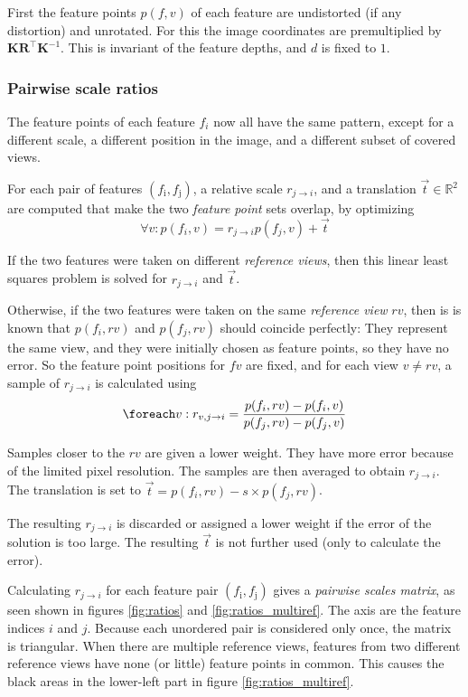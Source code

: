 \documentclass[11pt]{scrreprt}
\newcommand{\matr}[1]{\mathbf{#1}}
\newcommand{\transpose}[1]{#1^\intercal}
\begin{document}
First the feature points $p(f,v)$ of each feature are undistorted (if any distortion) and unrotated. For this the image coordinates are premultiplied by $\matr{K} \transpose{\matr{R}} \matr{K}^{-1}$. This is invariant of the feature depths, and $d$ is fixed to $1$.

\subsubsection{Pairwise scale ratios}
The feature points of each feature $f_i$ now all have the same pattern, except for a different scale, a different position in the image, and a different subset of covered views.

For each pair of features $(f_\text{i}, f_\text{j})$, a relative scale $r_{j\rightarrow i}$, and a translation $\vec{t} \in \mathbb{R}^2$ are computed that make the two \emph{feature point} sets overlap, by optimizing
\begin{equation}
\forall v : p(f_i, v) = r_{j\rightarrow i} p(f_j, v) + \vec{t}
\end{equation}

If the two features were taken on different \emph{reference views}, then this linear least squares problem is solved for $r_{j\rightarrow i}$ and $\vec{t}$.

Otherwise, if the two features were taken on the same \emph{reference view} $rv$, then is is known that $p(f_i, rv)$ and $p(f_j, rv)$ should coincide perfectly: They represent the same view, and they were initially chosen as feature points, so they have no error. So the feature point positions for $fv$ are fixed, and for each view $v \neq rv$, a sample of $r_{j\rightarrow i}$ is calculated using
\begin{equation*}
\foreach v : r_{v,j\rightarrow i} = \frac{p(f_i, rv) - p(f_i, v)}{p(f_j, rv) - p(f_j, v)}
\end{equation*}

Samples closer to the $rv$ are given a lower weight. They have more error because of the limited pixel resolution. The samples are then averaged to obtain $r_{j\rightarrow i}$. The translation is set to $\vec{t} = p(f_i, rv) - s \times p(f_j, rv)$.

The resulting $r_{j\rightarrow i}$ is discarded or assigned a lower weight if the error of the solution is too large. The resulting $\vec{t}$ is not further used (only to calculate the error).

Calculating $r_{j\rightarrow i}$ for each feature pair $(f_\text{i}, f_\text{j})$ gives a \emph{pairwise scales matrix}, as seen shown in figures \ref{fig:ratios} and \ref{fig:ratios_multiref}. The axis are the feature indices $i$ and $j$. Because each unordered pair is considered only once, the matrix is triangular. When there are multiple reference views, features from two different reference views have none (or little) feature points in common. This causes the black areas in the lower-left part in figure \ref{fig:ratios_multiref}.
\end{document}
